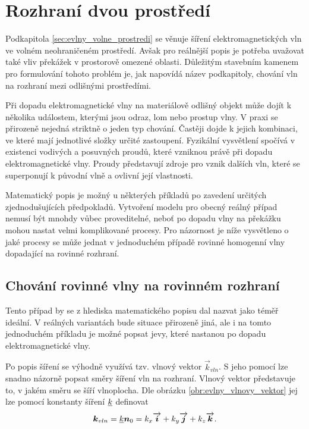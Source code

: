 \section{Rozhraní dvou prostředí} \label{sec:evlny_rozhrani_dvou_prostredi}
Podkapitola \ref{sec:evlny_volne_prostredi} se věnuje šíření elektromagnetických vln ve volném neohraničeném prostředí. Avšak pro reálnější popis je potřeba uvažovat také vliv překážek v prostorově omezené oblasti. Důležitým stavebním kamenem pro formulování tohoto problém je, jak napovídá název podkapitoly, chování vln na rozhraní mezi odlišnými prostředími.

Při dopadu elektromagnetické vlny na materiálově odlišný objekt může dojít k několika událostem, kterými jsou odraz, lom nebo prostup vlny. V praxi se přirozeně nejedná striktně o jeden typ chování. Častěji dojde k jejich kombinaci, ve které mají jednotlivé složky určité zastoupení. Fyzikální vysvětlení spočívá v existenci vodivých a posuvných proudů, které vzniknou právě při dopadu elektromagnetické vlny. Proudy představují zdroje pro vznik dalších vln, které se superponují k původní vlně a ovlivní její vlastnosti. 

Matematický popis je možný u některých příkladů po zavedení určitých zjednodušujících předpokladů. Vytvoření modelu pro obecný reálný případ nemusí být mnohdy vůbec proveditelné, neboť po dopadu vlny na překážku mohou nastat velmi komplikované procesy. Pro názornost je níže vysvětleno o jaké procesy se může jednat v jednoduchém případě rovinné homogenní vlny dopadající na rovinné rozhraní.

\subsection*{Chování rovinné vlny na rovinném rozhraní}
Tento případ by se z hlediska matematického popisu dal nazvat jako téměř ideální. V reálných variantách bude situace přirozeně jiná, ale i na tomto jednoduchém příkladu je možné popsat jevy, které nastanou po dopadu elektromagnetické vlny. 

Po popis šíření se výhodně využívá tzv. vlnový vektor $\vec k_{vln}$. S jeho pomocí lze snadno názorně popsat směry šíření vln na rozhraní. Vlnový vektor představuje to, v jakém směru se šíří vlnoplocha. Dle obrázku \ref{obr:evlny_vlnovy_vektor} jej lze pomocí konstanty šíření ${\underline{k}}$ definovat
\begin{equation}
	\mbox{\boldmath$k$}_{vln} = {\underline{k}} \mbox{\boldmath$n$}_{0} = k_{x}\overrightarrow{\mbox{\boldmath$i$}} + k_{y}\overrightarrow{\mbox{\boldmath$j$}} + k_{z}\overrightarrow{\mbox{\boldmath$k$}}.
	\label{rce:evlny_vlnovy_vektor}
\end{equation}

